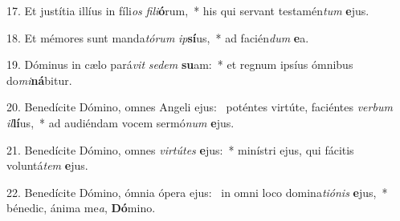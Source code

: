 17. Et justítia illíus in fíli\textit{os} \textit{fi}\textit{li}\textbf{ó}rum,~*  his qui servant testamén\textit{tum} \textbf{e}jus.\

18. Et mémores sunt manda\textit{tó}\textit{rum} \textit{ip}\textbf{sí}us,~*  ad facién\textit{dum} \textbf{e}a.\

19. Dóminus in cælo pará\textit{vit} \textit{se}\textit{dem} \textbf{su}am:~*  et regnum ipsíus ómnibus do\textit{mi}\textbf{ná}bitur.\

20. Benedícite Dómino, omnes Angeli ejus: \dag\  poténtes virtúte, faciéntes \textit{ver}\textit{bum} \textit{il}\textbf{lí}us,~*  ad audiéndam vocem sermó\textit{num} \textbf{e}jus.\

21. Benedícite Dómino, omnes \textit{vir}\textit{tú}\textit{tes} \textbf{e}jus:~*  minístri ejus, qui fácitis voluntá\textit{tem} \textbf{e}jus.\

22. Benedícite Dómino, ómnia ópera ejus: \dag\  in omni loco domina\textit{ti}\textit{ó}\textit{nis} \textbf{e}jus,~*  bénedic, ánima me\textit{a}, \textbf{Dó}mino.\

